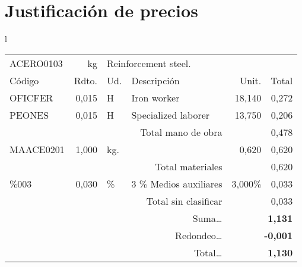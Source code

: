\documentclass{book}%
\begin{document}
%
\normalsize%
\part{Justificación de precios}%
\label{sec:Justificacindeprecios}%
\small%
\begin{longtable}{l}%
\begin{tabular}{l r l p{60mm} r r}%
ACERO0103&kg&\multicolumn{4}{p{95mm}}{Reinforcement steel.}\\%
Código&Rdto.&Ud.&Descripción&Unit.&Total\\%
\hline%
OFICFER&     0,015&H&Iron worker&    18,140&     0,272\\%
PEONES&     0,015&H&Specialized laborer&    13,750&     0,206\\%
\multicolumn{4}{r}{Total mano de obra}&&     0,478\\%
MAACE0201&     1,000&kg.&&     0,620&     0,620\\%
\multicolumn{4}{r}{Total materiales}&&     0,620\\%
\%003&     0,030&\%&3 \% Medios auxiliares&     3,000\%&     0,033\\%
\multicolumn{4}{r}{Total sin clasificar}&&     0,033\\%
\multicolumn{4}{r}{Suma\ldots}&\multicolumn{2}{r}{\textbf{     1,131}}\\%
\multicolumn{4}{r}{Redondeo\ldots}&\multicolumn{2}{r}{\textbf{    {-}0,001}}\\%
\multicolumn{4}{r}{Total\ldots}&\multicolumn{2}{r}{\textbf{     1,130}}\\%
\end{tabular}\\%
\end{longtable}%
\normalsize

%
\end{document}
